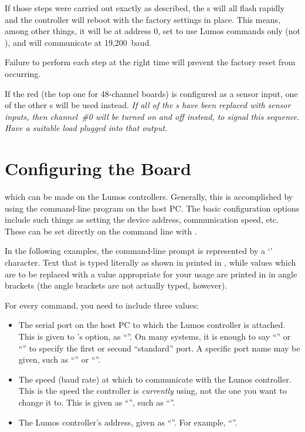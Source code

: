 \documentclass[letterpaper,twoside,onecolumn,openright,final]{memoir}
\begin{document}
If those steps were carried out exactly as described, the s will all flash rapidly 
and the controller will reboot with the factory settings in place.  This means, among other things,
it will be at address 0, set to use Lumos commands only (not ), and will communicate
at 19,200~baud.

Failure to perform each step at the right time will prevent the factory reset from occurring.

 If the red  (the top one for 48-channel boards) is configured as a
sensor input, one of the other s will be used instead.  \emph{If all of the 
s have been replaced with sensor inputs, then channel~\#0 will be turned on
and off instead, to signal this sequence.  Have a suitable load plugged into that output.}

\chapter{Configuring the Board}
 which can be made on the Lumos controllers.  Generally,
this is accomplished by using the  com\-mand-line program on the host PC.  The basic configuration
options include such things as setting the device address, communication speed, etc.  These can be set
directly on the command line with .

In the following examples, the command-line prompt is represented by a `\z{\$}' character.
Text that is typed literally as shown in printed in , while values which are
to be replaced with a value appropriate for your usage are printed in  in angle brackets
(the angle brackets are not actually typed, however).

For every command, you need to include three values:
\begin{itemize}
	\item 	The serial port on the host PC to which the Lumos controller is attached.  This is
		given to 's  option, as ``''.  On many
		systems, it is enough to say ``'' or ``'' to specify the first
		or second ``standard'' port.  A specific port name may be given, such as 
		``'' or ``''.
	\item	The speed (baud rate) at which to communicate with the Lumos controller.  This is
		the speed the controller is \emph{currently} using, not the one you want to change it
		to.  This is given as ``'', such as ``''.
	\item	The Lumos controller's address, given as ``''.  For example,
		``''.
\end{itemize}
\end{document}
